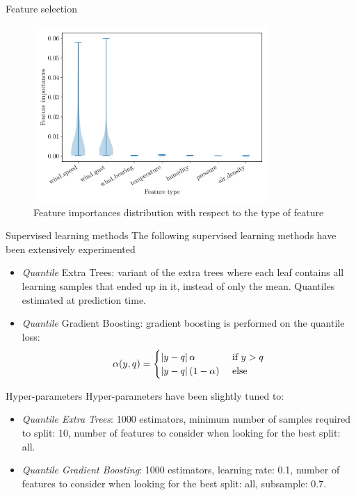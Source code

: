 \documentclass[12pt]{beamer}
\begin{document}
\begin{frame}{Feature selection}
	\begin{figure}
		\centering
		\includegraphics[width=0.8\textwidth]{resources/pdf/wind_fi.pdf}
		\vspace{-1em}
		\caption{Feature importances distribution with respect to the type of feature}
	\end{figure}
\end{frame}

\begin{frame}{Supervised learning methods}
	The following supervised learning methods have been extensively experimented
	\begin{itemize}
		\item \emph{Quantile} Extra Trees: variant of the extra trees where each leaf contains all learning samples that ended up in it, instead of only the mean. Quantiles estimated at prediction time.
		\item \emph{Quantile} Gradient Boosting: gradient boosting is performed on the quantile loss:
		\begin{equation*}
			\alpha(y, q) = \begin{cases}
				\left|y - q\right| \alpha & \text{ if } y > q \\
				\left|y - q\right| (1 - \alpha) & \text{ else }
			\end{cases}
		\end{equation*}
	\end{itemize}
\end{frame}

\begin{frame}{Hyper-parameters}
	Hyper-parameters have been slightly tuned to:
	\begin{itemize}
		\item \emph{Quantile Extra Trees}: \num{1000} estimators, minimum number of samples required to split: \num{10}, number of features to consider when looking for the best split: all.
		\item \emph{Quantile Gradient Boosting}: \num{1000} estimators, learning rate: \num{0.1}, number of features to consider when looking for the best split: all, subsample: \num{0.7}.
	\end{itemize}
\end{frame}
\end{document}
